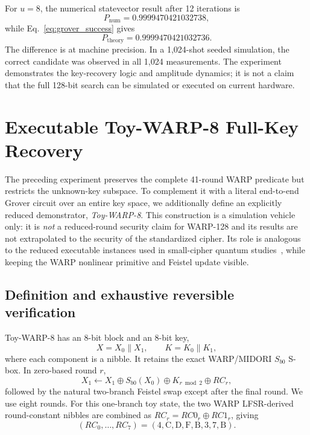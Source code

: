 \documentclass[pdflatex,sn-nature]{sn-jnl}
\theoremstyle{thmstyleone}
\theoremstyle{thmstyletwo}
\begin{document}
For $u=8$, the numerical statevector result after 12 iterations is
\begin{equation}
    P_{\mathrm{num}}=0.9999470421032738,
\end{equation}
while Eq.~\eqref{eq:grover_success} gives
\begin{equation}
    P_{\mathrm{theory}}=0.9999470421032736.
\end{equation}
The difference is at machine precision. In a 1,024-shot seeded simulation, the correct candidate was observed in all 1,024 measurements. The experiment demonstrates the key-recovery logic and amplitude dynamics; it is not a claim that the full 128-bit search can be simulated or executed on current hardware.


\section{Executable Toy-WARP-8 Full-Key Recovery}
\label{sec:toywarp8}

The preceding experiment preserves the complete 41-round WARP predicate but restricts the unknown-key subspace.  To complement it with a literal end-to-end Grover circuit over an entire key space, we additionally define an explicitly reduced demonstrator, \emph{Toy-WARP-8}.  This construction is a simulation vehicle only: it is \emph{not} a reduced-round security claim for WARP-128 and its results are not extrapolated to the security of the standardized cipher.  Its role is analogous to the reduced executable instances used in small-cipher quantum studies~\cite{Kiran2026}, while keeping the WARP nonlinear primitive and Feistel update visible.

\subsection{Definition and exhaustive reversible verification}
Toy-WARP-8 has an 8-bit block and an 8-bit key,
\begin{equation}
    X=X_0\|X_1,\qquad K=K_0\|K_1,
\end{equation}
where each component is a nibble.  It retains the exact WARP/MIDORI $S_{b0}$ S-box.  In zero-based round $r$,
\begin{equation}
    X_1\leftarrow X_1\oplus S_{b0}(X_0)\oplus K_{r\bmod 2}\oplus RC_r,
    \label{eq:toywarp_round}
\end{equation}
followed by the natural two-branch Feistel swap except after the final round.  We use eight rounds.  For this one-branch toy state, the two WARP LFSR-derived round-constant nibbles are combined as $RC_r=RC0_r\oplus RC1_r$, giving
\begin{equation}
    (RC_0,\ldots,RC_7)=(4,\mathrm{C},\mathrm{D},\mathrm{F},\mathrm{B},3,7,\mathrm{B}).
\end{equation}
\end{document}
